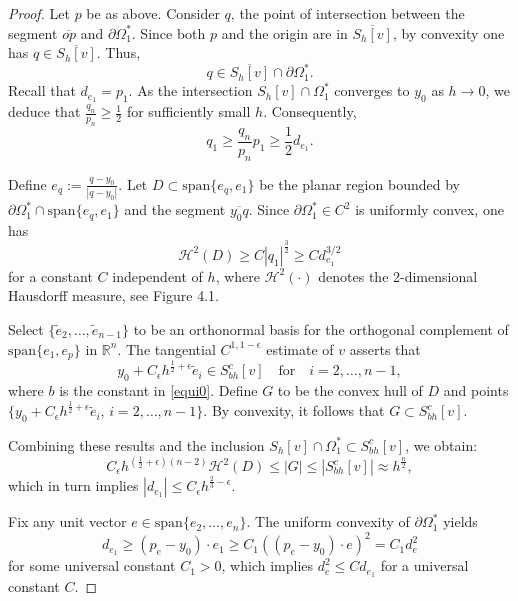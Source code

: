 \documentclass[10pt,a4paper]{amsart}
\theoremstyle{plain}
\newcommand{\0}{\textbf{0}}
\numberwithin{equation}{section}
\numberwithin{equation}{section}
\numberwithin{figure}{section}
\begin{document}
\begin{proof}
Let \( p \) be as above. Consider \( q \), the point of intersection between the segment \( \overline{op} \) and \( \partial\Omega_1^* \). 
Since both \( p \) and the origin are in \( \overline{S_h[v]} \), by convexity one has \( q \in \overline{S_h[v]} \). Thus,
\[ q \in \overline{S_h[v]} \cap \partial\Omega_1^*. \]
Recall that \( d_{e_1} = p_1 \). 
As the intersection \( S_h[v] \cap \Omega_1^* \) converges to \( y_0 \) as \( h\rightarrow 0 \), we deduce that \( \frac{q_n}{p_n} \geq \frac{1}{2} \) for sufficiently small \( h \). Consequently,
\[ q_1 \geq \frac{q_n}{p_n} p_1 \geq \frac{1}{2} d_{e_1}. \] 

Define \( e_q := \frac{q - y_0}{|q - y_0|} \). 
Let \( D \subset \mathrm{span}\{e_q, e_1\} \) be the planar region bounded by \( \partial\Omega_1^* \cap \mathrm{span}\{e_q, e_1\} \) and the segment \( \overline{y_0q} \). 
Since \( \partial\Omega_1^*\in C^2 \) is uniformly convex, one has 
	\[ \mathcal{H}^2(D) \geq C|q_1|^{\frac{3}{2}} \geq Cd_{e_1}^{3/2} \] 
for a constant \( C \) independent of \( h \), where \( \mathcal{H}^2(\cdot) \) denotes the 2-dimensional Hausdorff measure, see Figure 4.1.

Select \( \{\tilde{e}_2, \ldots, \tilde{e}_{n-1}\} \) to be an orthonormal basis for the orthogonal complement of \( \mathrm{span}\{e_1, e_p\} \) in \( \mathbb{R}^n \). The tangential \( C^{1, 1-\epsilon} \) estimate of \( v \) asserts that
\[ y_0 + C_\epsilon h^{\frac{1}{2}+\epsilon}\tilde{e}_i \in S^c_{bh}[v] \quad \text{for} \quad i=2, \ldots, n-1, \]
where \( b \) is the constant in \eqref{equi0}.
Define \( G \) to be the convex hull of \( D \) and points \(\{ y_0 + C_\epsilon h^{\frac{1}{2}+\epsilon}\tilde{e}_i, \, i=2, \ldots, n-1 \}\). By convexity, it follows that \( G \subset S^c_{bh}[v] \).

Combining these results and the inclusion $S_h[v]\cap \Omega_1^* \subset S^c_{bh}[v]$, we obtain:
\[
C_\epsilon h^{(\frac{1}{2}+\epsilon)(n-2)}\mathcal{H}^2(D) \leq |G| \leq |S^c_{bh}[v]| \approx h^{\frac{n}{2}},
\]
which in turn implies $|d_{e_1}| \leq C_{\epsilon}h^{\frac{2}{3} - \epsilon}$.

Fix any unit vector $e \in \mathrm{span}\{e_2, \ldots, e_n\}$. The uniform convexity of $\partial\Omega_1^*$ yields 
	\[ d_{e_1} \geq (p_e-y_0) \cdot e_1 \geq C_1((p_e-y_0) \cdot e)^2 = C_1d_e^2  \]
for some universal constant $C_1>0$, which implies $d_e^2 \leq C d_{e_1}$ for a universal constant $C$.
\end{proof}
\end{document}
